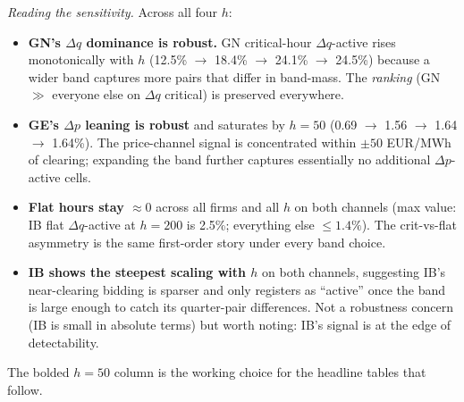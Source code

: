 \documentclass[11pt,a4paper]{article}
\begin{document}
\textit{Reading the sensitivity.} Across all four $h$:
\begin{itemize}
\item \textbf{GN's $\Delta q$ dominance is robust.} GN critical-hour $\Delta q$-active rises monotonically with $h$ (12.5\% $\to$ 18.4\% $\to$ 24.1\% $\to$ 24.5\%) because a wider band captures more pairs that differ in band-mass. The \emph{ranking} (GN $\gg$ everyone else on $\Delta q$ critical) is preserved everywhere.
\item \textbf{GE's $\Delta p$ leaning is robust} and saturates by $h=50$ (0.69 $\to$ 1.56 $\to$ 1.64 $\to$ 1.64\%). The price-channel signal is concentrated within $\pm 50$ EUR/MWh of clearing; expanding the band further captures essentially no additional $\Delta p$-active cells.
\item \textbf{Flat hours stay $\approx 0$} across all firms and all $h$ on both channels (max value: IB flat $\Delta q$-active at $h=200$ is 2.5\%; everything else $\le 1.4\%$). The crit-vs-flat asymmetry is the same first-order story under every band choice.
\item \textbf{IB shows the steepest scaling with $h$} on both channels, suggesting IB's near-clearing bidding is sparser and only registers as ``active'' once the band is large enough to catch its quarter-pair differences. Not a robustness concern (IB is small in absolute terms) but worth noting: IB's signal is at the edge of detectability.
\end{itemize}
The bolded $h=50$ column is the working choice for the headline tables that follow.

\bigskip
\end{document}
